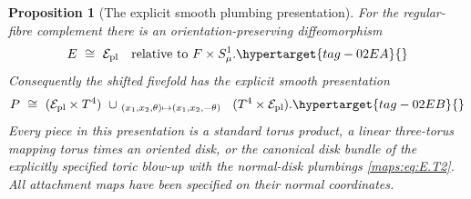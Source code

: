 \documentclass[11pt,a4paper]{article}
\numberwithin{equation}{section}
\newtheorem{proposition}[proposition]{Proposition}
\theoremstyle{definition}
\begin{document}
\begin{proposition}[The explicit smooth plumbing presentation]
For the regular-fibre complement there is an
orientation-preserving diffeomorphism
\begin{equation}
                  E\ \cong\ \mathcal E_{\rm pl}
                 \quad\hbox{relative to }F\times S^1_\mu .
 \hypertarget{tag-02EA}{}\label{maps:eq:E.U5}
\end{equation}
Consequently the shifted fivefold has the explicit smooth
presentation
\begin{equation}
 P\ \cong\
 (\mathcal E_{\rm pl}\times T^4)
 \ \cup_{\ (x_1,x_2,\theta)\mapsto(x_1,x_2,-\theta)\ }\
 (T^4\times\mathcal E_{\rm pl}).
 \hypertarget{tag-02EB}{}\label{maps:eq:E.U6}
\end{equation}
Every piece in this presentation is a standard torus product,
a linear three-torus mapping torus times an oriented disk, or
the canonical disk bundle of the explicitly specified toric
blow-up with the normal-disk plumbings \eqref{maps:eq:E.T2}.  All attachment
maps have been specified on their normal coordinates.

\end{proposition}
\end{document}
